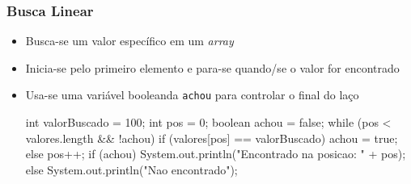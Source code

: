 \documentclass[xcolor={dvipsnames,table},aspectratio=169]{beamer}
\begin{document}
\begin{frame}[fragile]\frametitle{Busca Linear}
\begin{itemize}
	\item Busca-se um valor específico em um \emph{array}
	\item Inicia-se pelo primeiro elemento e para-se quando/se o valor for encontrado
	\item Usa-se uma variável booleanda \texttt{achou} para controlar o final do laço
{\scriptsize
\begin{javacode}
int valorBuscado = 100;  int pos = 0;
boolean achou = false;
while (pos < valores.length && !achou) {
   if (valores[pos] == valorBuscado) {
      achou = true;
   }
   else {
      pos++;
   }
}
if (achou)
   System.out.println("Encontrado na posicao: " + pos);
else
   System.out.println("Nao encontrado");
\end{javacode}
}
\end{itemize}
\end{frame}
\end{document}
